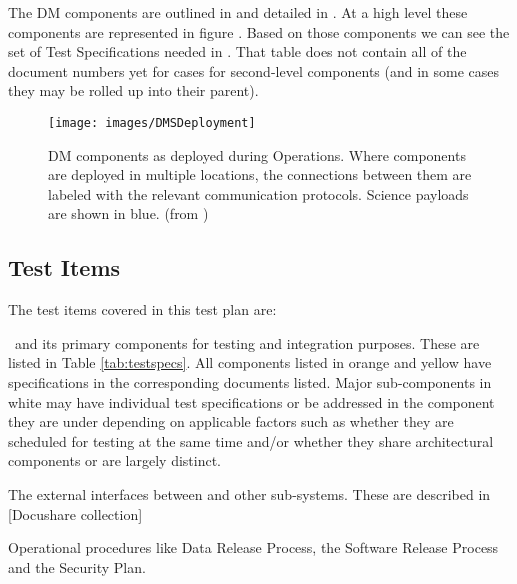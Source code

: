  The DM components are  outlined in  and detailed in . At a high level these components are represented in figure .  Based on those components we can see the set of Test Specifications needed in . That table does not contain all of the document numbers yet for cases for second-level components (and in some cases they may be rolled up into their parent). 


\begin{figure}[htbp]
	\begin{center}
		\texttt{[image: images/DMSDeployment]}
		\caption{DM components as deployed during Operations. Where components are
			deployed in multiple locations, the connections between them are labeled with
			the relevant communication protocols. Science payloads are shown in blue.
		\label{fig:dmsdeploy} (from )}
	\end{center}
\end{figure}

\subsection{Test Items}

\begin{table}
	\caption{Components from LDM-148 with the test specifications to verify them. \label{tab:testspecs}}
	
\end{table}

The test items covered in this test plan are:

\begin{itemize_single}
\item \product \ and its primary components for testing and integration purposes. These are listed in Table \ref{tab:testspecs}. All components listed in orange and yellow have specifications in the corresponding documents listed. Major sub-components in white may have individual test specifications or be addressed in the component they are under depending on applicable factors such as whether they are scheduled for testing at the same time and/or whether they share architectural components or are largely distinct. 

\item The external interfaces between \product and other sub-systems. These are described in [Docushare collection]

\item Operational procedures like Data Release Process, the Software Release Process and the Security Plan. 

\end{itemize_single}


